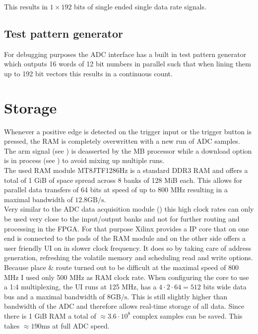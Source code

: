 This results in $1 \times 192$ bits of single ended single data rate signals. \\

\subsection{Test pattern generator}
For debugging purposes the \gls{ADC} interface has a built in test pattern
generator which outputs 16 words of 12 bit numbers in parallel such that
when lining them up to 192 bit vectors this results in a continuous count.

\section{Storage}
\label{sec:fpga_storage}
Whenever a positive edge is detected on the trigger input or the trigger
button is pressed, the \gls{RAM} is completely overwritten with a new run of
\gls{ADC} samples. \\

The arm signal (see ) is deasserted
by the \gls{MB} processor while a download option is in process
(see ) to avoid mixing up multiple runs. \\

The used \gls{RAM} module MT8JTF1286Hz is a standard \acrshort{DDR}3 \gls{RAM}
and offers a total of 1 GiB of space spread across 8 banks of 128 MiB each.
This allows for parallel data transfers of 64 bits at speed of up to 800 MHz
resulting in a maximal bandwidth of $12.8 \text{GB}/\text{s}$. \\

Very similar to the \gls{ADC} data acquisition module ()
this high clock rates can only be used very close to the input/output banks
and not for further routing and processing in the \gls{FPGA}.
For that purpose Xilinx provides a \gls{IP} core that on one end is connected
to the pads of the \gls{RAM} module and on the other side offers a user
friendly \gls{UI} on in slower clock frequency.
It does so by taking care of address generation, refreshing the volatile
memory and scheduling read and write options. \\

Because place \& route turned out to be difficult at the maximal speed
of 800 MHz I used only 500 MHz as \gls{RAM} clock rate.
When configuring the core to use a 1:4 multiplexing, the \gls{UI} runs
at 125 MHz, has a $4 \cdot 2 \cdot 64 = 512$ bits wide data bus
and a maximal bandwidth of $8 \text{GB}/\text{s}$. This is still slightly
higher than bandwidth of the \gls{ADC} and therefore allows real-time
storage of all data. Since there is 1 GiB \gls{RAM}
a total of $\approx 3.6 \cdot 10^8$ complex samples can be saved. This
takes $\approx 190 \text{ms}$ at full \gls{ADC} speed. \\

